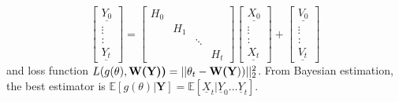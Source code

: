 \documentclass[a4paper,english,12pt]{article}
\begin{document}
  \begin{equation}
   \left[\begin{array}{c}
         \underline{Y_0}\\
         \vdots\\
         \colon\\
         \underline{Y_t}
        \end{array}\right] = 
       \left[\begin{array}{cccc}
         H_0\\
         \ & H_1\\
         \ &\ &\ddots\\
         \ &\ &\ &H_t
        \end{array}\right] 
        \left[\begin{array}{c}
         \underline{X_0}\\
         \vdots\\
         \colon\\
         \underline{X_t}
        \end{array}\right] + 
        \left[\begin{array}{c}
         \underline{V_0}\\
         \vdots\\
         \colon\\
         \underline{V_t}
        \end{array}\right]
 \end{equation}
and loss function $L(g(\theta),\textbf{W(\textbf{Y}))} = ||\theta_t - \textbf{W(\textbf{Y}}))||_2^2$. From Bayesian estimation, the best estimator is $\mathbb{E}[g(\theta)|\textbf{Y}]=
  \mathbb{E}[\underline{X}_t|\underline{Y}_0...\underline{Y}_t]$.
\end{document}
